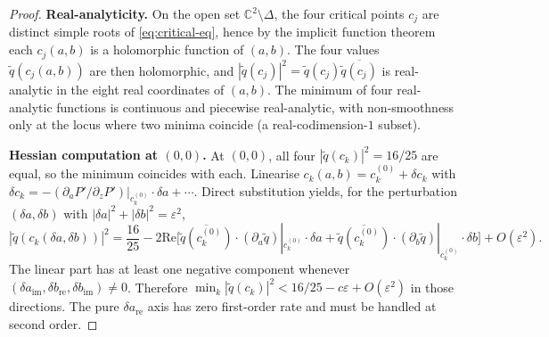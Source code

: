 \documentclass[11pt,a4paper]{article}
\begin{document}
\begin{proof}
\textbf{Real-analyticity.} On the open set $\mathbb{C}^2 \setminus \Delta$, the four critical points $c_j$ are distinct simple roots of \eqref{eq:critical-eq}, hence by the implicit function theorem each $c_j(a, b)$ is a holomorphic function of $(a, b)$. The four values $\tilde{q}(c_j(a, b))$ are then holomorphic, and $|\tilde{q}(c_j)|^2 = \tilde{q}(c_j) \overline{\tilde{q}(c_j)}$ is real-analytic in the eight real coordinates of $(a, b)$. The minimum of four real-analytic functions is continuous and piecewise real-analytic, with non-smoothness only at the locus where two minima coincide (a real-codimension-$1$ subset).

\textbf{Hessian computation at $(0, 0)$.} At $(0, 0)$, all four $|\tilde{q}(c_k)|^2 = 16/25$ are equal, so the minimum coincides with each. Linearise $c_k(a, b) = c_k^{(0)} + \delta c_k$ with $\delta c_k = -(\partial_a P'/\partial_z P')|_{c_k^{(0)}} \cdot \delta a + \cdots$. Direct substitution yields, for the perturbation $(\delta a, \delta b)$ with $|\delta a|^2 + |\delta b|^2 = \varepsilon^2$,
\begin{equation}
|\tilde{q}(c_k(\delta a, \delta b))|^2 = \frac{16}{25} - 2 \mathrm{Re}\!\bigl[\overline{\tilde{q}(c_k^{(0)})} \cdot (\partial_a \tilde{q})|_{c_k^{(0)}} \cdot \delta a + \overline{\tilde{q}(c_k^{(0)})} \cdot (\partial_b \tilde{q})|_{c_k^{(0)}} \cdot \delta b\bigr] + O(\varepsilon^2).
\label{eq:linear-pert}
\end{equation}
The linear part has at least one negative component whenever
$(\delta a_{\mathrm{im}},\delta b_{\mathrm{re}},\delta b_{\mathrm{im}})\ne0$.
Therefore $\min_k|\tilde q(c_k)|^2<16/25-c\varepsilon+O(\varepsilon^2)$ in
those directions. The pure $\delta a_{\mathrm{re}}$ axis has zero first-order
rate and must be handled at second order.


\end{proof}
\end{document}
